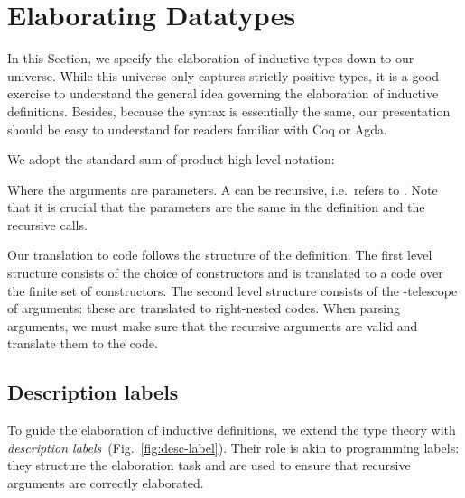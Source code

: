 \documentclass{scrartcl}
\theoremstyle{plain}
\theoremstyle{definition}
\newcommand{\ie}{i.e.\ }
\begin{document}
\fi



\section{Elaborating Datatypes}
\label{sec:elab-data-types}



In this Section, we specify the elaboration of inductive types down to
our  universe. While this universe only captures strictly
positive types, it is a good exercise to understand the general idea
governing the elaboration of inductive definitions. Besides, because
the syntax is essentially the same, our presentation should be easy to
understand for readers familiar with Coq or Agda.



We adopt the standard sum-of-product high-level notation:

Where the arguments  are parameters. A  can be
recursive, \ie refers to . Note that it is
crucial that the parameters are the same in the definition and the
recursive calls.

Our translation to code follows the structure of the definition. The
first level structure consists of the choice of constructors and is
translated to a  code over the finite set of
constructors. The second level structure consists of the
-telescope of arguments: these are translated to
right-nested  codes. When parsing arguments, we must make
sure that the recursive arguments are valid and translate them to the
 code.



\subsection{Description labels}
\label{sec:desc-labels}

\newcommand{\datatel}[1]{\mathrm{datatel}}
\newcommand{\TypeDatatel}[2]{\Judgment{#1}{#2 \:\datatel{}}}

\newcommand{\IntDatatel}[1]{\green{\llbracket} #1 \green{\rrbracket}_P}

\newcommand{\LabelDesc}[1]{\langle #1 \rangle}
\newcommand{\CallDesc}[2]{\Function{call}\: \LabelDesc{#1}\: #2}



To guide the elaboration of inductive definitions, we extend the type
theory with \emph{description
  labels}~(Fig.~\ref{fig:desc-label}). Their role is akin to
programming labels: they structure the elaboration task and are used
to ensure that recursive arguments are correctly elaborated.
\end{document}

